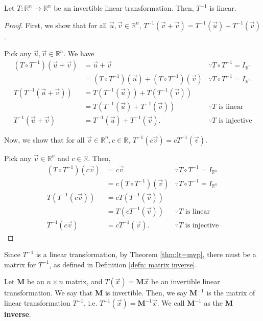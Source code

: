 \documentclass[]{book}
\newcommand{\inv}[1]{\ensuremath{{#1}^{-1}}}
\newcommand{\invm}[1]{\ensuremath{\inv{\mat{#1}}}}
\newcommand{\mat}[1]{\ensuremath{\mathbf{#1}}}
\newcommand{\R}{\ensuremath{\mathbb{R}}}
\begin{document}
\begin{theorem}
    \label{thm: inverses of linear transformations are linear}
    Let $T: \R^n \to \R^n$ be an invertible linear transformation. Then, $\inv{T}$ is linear.
\begin{proof}
    First, we show that for all $\vec{u},\vec{v} \in \R^n$, $\inv{T}\left(\vec{v} + \vec{v}\right) = \inv{T}\left(\vec{u}\right) + \inv{T}\left(\vec{v}\right)$.
    
    Pick any $\vec{u},\vec{v} \in \R^n$. We have
    \begin{align*}
        (T \circ \inv{T})(\vec{u} + \vec{v}) &= \vec{u} + \vec{v} & \because T \circ \inv{T} = I_{\R^n} \\
        &= (T \circ \inv{T})(\vec{u}) + (T \circ \inv{T})(\vec{v}) & \because T \circ \inv{T} = I_{\R^n} \\
        T(\inv{T}(\vec{u}+ \vec{v})) &= T(\inv{T}(\vec{u})) + T(\inv{T}(\vec{v})) \\
        &= T(\inv{T}(\vec{u}) + \inv{T}(\vec{v})) & \because \text{$T$ is linear} \\
        \inv{T}(\vec{u} + \vec{v}) &= \inv{T}(\vec{u}) + \inv{T}(\vec{v}). & \because \text{$T$ is injective}
    \end{align*}
    
    Now, we show that for all $\vec{v} \in \R^n, c \in \R$, $\inv{T}(c\vec{v}) = c\inv{T}(\vec{v})$.
    
    Pick any $\vec{v} \in \R^n$ and $c \in \R$. Then,
    \begin{align*}
        (T \circ \inv{T})(c\vec{v}) &= c\vec{v} & \because T \circ \inv{T} = I_{\R^n} \\
        &= c(T \circ \inv{T})(\vec{v}) & \because T \circ \inv{T} = I_{\R^n} \\
        T(\inv{T}(c\vec{v})) &= cT(\inv{T}(\vec{v})) \\
        &= T(c\inv{T}(\vec{v})) & \because \text{$T$ is linear} \\
        \inv{T}(c\vec{v}) &= c\inv{T}(\vec{v}). & \because \text{$T$ is injective}
    \end{align*}
\end{proof}
\end{theorem}

Since $\inv{T}$ is a linear transformation, by Theorem \ref{thm:lt=mvp}, there must be a matrix for $\inv{T}$, as defined in Definition \ref{defn: matrix inverse}.

\begin{definition}
    \label{defn: matrix inverse}
    Let $\mat{M}$ be an $n \times n$ matrix, and $T(\vec{x}) = \mat{M}\vec{x}$ be an invertible linear transformation. We say that $\mat{M}$ is invertible. Then, we say $\invm{M}$ is the matrix of linear transformation $\inv{T}$, i.e. $\inv{T}(\vec{x}) = \invm{M}\vec{x}$. We call $\invm{M}$ as the \textbf{$\pmb{\mat{M}}$ inverse}.
\end{definition}
\end{document}
